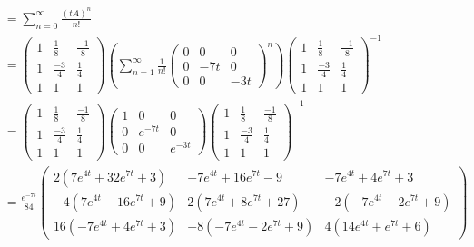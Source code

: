 \documentclass[11pt]{article}
\begin{document}
\begin{enumerate}
\begin{solution}
\begin{align*}
        &= \sum_{n=0}^\infty \frac{(tA)^n}{n!}\\
        &= \begin{pmatrix}
            1 & \frac{1}{8} & \frac{-1}{8}\\
            1 & \frac{-3}{4} & \frac{1}{4}\\
            1 & 1 & 1
        \end{pmatrix}\left(\sum_{n=1}^\infty \frac{1}{n!}\begin{pmatrix}
            0 & 0 & 0\\
            0 & -7t & 0\\
            0 & 0 &-3t
        \end{pmatrix}^n\right) \begin{pmatrix}
            1 & \frac{1}{8} & \frac{-1}{8}\\
            1 & \frac{-3}{4} & \frac{1}{4}\\
            1 & 1 & 1
        \end{pmatrix}^{-1}\\
        &= \begin{pmatrix}
            1 & \frac{1}{8} & \frac{-1}{8}\\
            1 & \frac{-3}{4} & \frac{1}{4}\\
            1 & 1 & 1
        \end{pmatrix}\begin{pmatrix}
            1 & 0 & 0\\
            0 & e^{-7t} & 0\\
            0 & 0 &e^{-3t}
        \end{pmatrix}\begin{pmatrix}
            1 & \frac{1}{8} & \frac{-1}{8}\\
            1 & \frac{-3}{4} & \frac{1}{4}\\
            1 & 1 & 1
        \end{pmatrix}^{-1}\\
        &= \frac{e^{-7t}}{84}
\begin{pmatrix}
2\left(7 e^{4t} + 32 e^{7t} + 3\right) & -7 e^{4t} + 16 e^{7t} - 9 & -7 e^{4t} + 4 e^{7t} + 3 \\
-4\left(7 e^{4t} - 16 e^{7t} + 9\right) & 2\left(7 e^{4t} + 8 e^{7t} + 27\right) & -2\left(-7 e^{4t} - 2 e^{7t} + 9\right) \\
16\left(-7 e^{4t} + 4 e^{7t} + 3\right) & -8\left(-7 e^{4t} - 2 e^{7t} + 9\right) & 4\left(14 e^{4t} + e^{7t} + 6\right)
\end{pmatrix}

\end{align*}
\end{solution}
\end{enumerate}
\end{document}
